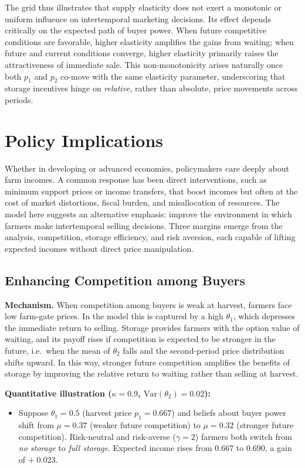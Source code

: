 The grid thus illustrates that supply elasticity does not exert a monotonic or uniform influence on intertemporal marketing decisions. Its effect depends critically on the expected path of buyer power. When future competitive conditions are favorable, higher elasticity amplifies the gains from waiting; when future and current conditions converge, higher elasticity primarily raises the attractiveness of immediate sale. This non-monotonicity arises naturally once both $p_1$ and $p_2$ co-move with the same elasticity parameter, underscoring that storage incentives hinge on \emph{relative}, rather than absolute, price movements across periods.







\section{Policy Implications}
\noindent
Whether in developing or advanced economies, policymakers care deeply about farm incomes. A common response has been direct interventions, such as minimum support prices or income transfers, that boost incomes but often at the cost of market distortions, fiscal burden, and misallocation of resources. The model here suggests an alternative emphasis: improve the environment in which farmers make intertemporal selling decisions. Three margins emerge from the analysis, competition, storage efficiency, and risk aversion, each capable of lifting expected incomes without direct price manipulation.



\subsection{Enhancing Competition among Buyers}

\textbf{Mechanism.} When competition among buyers is weak at harvest, farmers face low farm-gate prices. In the model this is captured by a high $\theta_1$, which depresses the immediate return to selling. Storage provides farmers with the option value of waiting, and its payoff rises if competition is expected to be stronger in the future, i.e.\ when the mean of $\theta_2$ falls and the second-period price distribution shifts upward. In this way, stronger future competition amplifies the benefits of storage by improving the relative return to waiting rather than selling at harvest.

\textbf{Quantitative illustration ($\kappa=0.9$, $\text{Var}(\theta_2)=0.02$):}
\begin{itemize}
  \item Suppose $\theta_1=0.5$ (harvest price $p_1=0.667$) and beliefs about buyer power shift from $\mu=0.37$ (weaker future competition) to $\mu=0.32$ (stronger future competition). Risk-neutral and risk-averse ($\gamma=2$) farmers both switch from \emph{no storage} to \emph{full storage}. Expected income rises from $0.667$ to $0.690$, a gain of $+\;0.023$.
\end{itemize}


